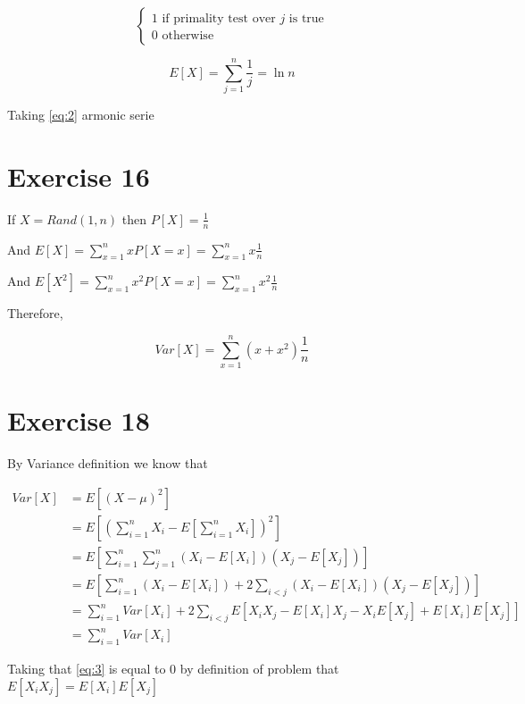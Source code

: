 \documentclass[12pt, a4paper]{article}
\begin{document}
\[
\begin{cases}
  1 \text{ if primality test over } j \text{ is true}\\
  0 \text{ otherwise}
\end{cases}
\]

\begin{equation}\label{eq:2}
  E[X] = \sum_{j=1}^n\frac{1}{j} = \ln n
\end{equation}

Taking \ref{eq:2} armonic serie 

\section{Exercise 16}
If $X = Rand(1,n)$ then $P[X] = \frac{1}{n}$

And $E[X]=\sum_{x=1}^n xP[X=x] = \sum_{x=1}^nx\frac{1}{n}$

And $E[X^2]=\sum_{x=1}^n x^2P[X=x] = \sum_{x=1}^nx^2\frac{1}{n}$

Therefore,

\begin{equation}
  Var[X] = \sum_{x=1}^n(x + x^2)\frac{1}{n}
\end{equation}

\section{Exercise 18}
By Variance definition we know that

\begin{subequations}
  \begin{align}
    Var[X] &= E[(X - \mu)^2]\\
           &= E\left[\left( \sum_{i=1}^n X_i - E\left[ \sum_{i=1}^n X_i \right]\right)^2\right]\\
           &= E\left[\sum_{i=1}^n\sum_{j=1}^n (X_i - E[X_i]) (X_j - E[X_j])\right]\\
           &= E\left[\sum_{i=1}^n (X_i - E[X_i]) + 2 \sum_{i<j} (X_i - E[X_i])(X_j - E[X_j])\right]\\
           &= \sum_{i=1}^n Var[X_i] + 2 \sum_{i<j} E[X_iX_j - E[X_i]X_j - X_iE[X_j] + E[X_i]E[X_j]] \label{eq:3}\\
           &= \sum_{i=1}^n Var[X_i]
  \end{align}
\end{subequations}

Taking that \ref{eq:3} is equal to $0$ by definition of problem that $E[X_iX_j]
= E[X_i]E[X_j]$
\end{document}
